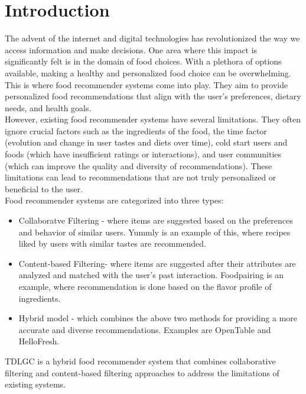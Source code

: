 \chapter{Introduction}\label{chapter:Introduction}

\indent The advent of the internet and digital technologies has revolutionized the way we access information and make decisions. One area where this impact is significantly felt is in the domain of food choices. With a plethora of options available, making a healthy and personalized food choice can be overwhelming. This is where food recommender systems come into play. They aim to provide personalized food recommendations that align with the user's preferences, dietary needs, and health goals.
\\

\indent However, existing food recommender systems have several limitations. They often ignore crucial factors such as the ingredients of the food, the time factor (evolution and change in user tastes and diets over time), cold start users and foods (which have insufficient ratings or interactions), and user communities (which can improve the quality and diversity of recommendations). These limitations can lead to recommendations that are not truly personalized or beneficial to the user.
\\

Food recommender systems are categorized into three types:
\begin{itemize}
  \item Collaboratve Filtering - where items are suggested based on the preferences and behavior of similar users. Yummly is an example of this, where recipes liked by users with similar tastes are recommended.
  \item Content-based Filtering- where items are suggested after their attributes are analyzed
and matched with the user's past interaction. Foodpairing is an example, where recommendation is done based on the flavor profile of ingredients.
  \item Hybrid model - which combines the above two methods for providing a more accurate and diverse recommendations. Examples are OpenTable and HelloFresh.
\end{itemize}

\indent TDLGC is a hybrid food recommender system that combines collaborative filtering and content-based filtering approaches to address the limitations of existing systems.